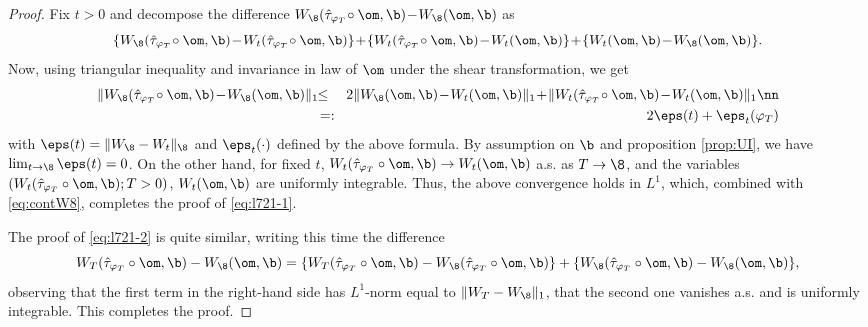 \begin{proof} Fix $t>0$ and decompose the difference $ W_\8(\hat \tau_{\varphi_T}\! \circ \om,\b) \!-\! { W_\8( \om,\b)}$ as
$$ 
 \{ W_\8(\hat \tau_{\varphi_T} \!\circ  \om,\b) \!-\! W_t(\hat \tau_{\varphi_T}\! \circ  \om,\b)\} \!+\! \{W_t(\hat \tau_{\varphi_T}\! \circ \om,\b) \!-\!  W_t( \om,\b)\} \!+\! \{ W_t( \om,\b)\! - \! W_\8( \om,\b)\}.
$$
Now, using triangular inequality and invariance in law of $\om$ under the shear transformation, we get
\begin{eqnarray}
\| { W_\8(\hat \tau_{\varphi_T}\! \circ \om,\b)} \!-\! { W_\8( \om,\b)}\|_1\! &\!\leq  \!&\! 2 
\| W_\8( \om,\b) \!- \! W_t( \om,\b)\|_1 \!+\! 
\| W_t(\hat \tau_{\varphi_T} \!\circ \om,\b) \!-\!  W_t( \om,\b)\|_1  \nn \\
\label{eq:contW8}
&=: & 2 \eps(t)+ \eps_t ( \varphi_T)
\end{eqnarray}
with $\eps(t)= \|W_\8-W_t\|_\8$ and 
$\eps_t(\cdot)$ defined by the above formula.
By assumption on $\b$ and proposition \ref{prop:UI},
we have $\lim_{t \to \8} \eps(t)=0$. On the other hand,  for fixed $t$, $W_t(\hat \tau_{\varphi_T} \circ \om,\b) \to  W_t( \om,\b)$ a.s. as $T \to \8$, 
and the variables $(W_t(\hat \tau_{\varphi_T} \circ \om,\b); T >0)$, $W_t( \om,\b)$ are uniformly integrable. Thus, the above convergence holds in $L^1$, which, combined with \eqref{eq:contW8}, completes the proof
of \eqref{eq:l721-1}. 

The proof of \eqref{eq:l721-2} is quite similar, writing this time the difference
$$
W_T(\hat \tau_{\varphi_T} \circ \om,\b)-  { W_\8( \om,\b)} = \{ W_T(\hat \tau_{\varphi_T} \circ \om,\b)- W_\8( \hat \tau_{\varphi_T} \circ \om,\b)\} +
\{ W_\8( \hat \tau_{\varphi_T} \circ \om,\b)- W_\8( \om,\b)\},
$$
observing that the first term in the right-hand side has $L^1$-norm equal to $\|W_T-W_\8\|_1$, that the second one vanishes a.s. and is uniformly integrable. This completes the proof.
\end{proof} 

